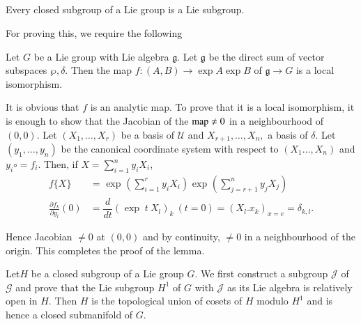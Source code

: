 \subsection{}\label{chap4-sec4.5} %

\begin{thm}[E. Cartan]\label{chap4-thm4}%
Every closed subgroup of a Lie group is a Lie subgroup.
\end{thm}

For proving this, we require the following

\setcounter{lem}{0}
\begin{lem}\label{chap4-lem1}%
 Let $G$ be a Lie group with Lie algebra $\mathfrak{g}$. Let
 $\mathfrak{g}$ be the direct sum of vector subspaces  $\wp,
 \delta$. Then the map $f: (A,B) \rightarrow \exp A \exp B$ of
 $\mathfrak{g}\rightarrow G$ is a local isomorphism. 
 \end{lem}


It is obvious that $f$ is an  analytic map. To prove that it is  a
local isomorphism, it is enough to show that the Jacobian of the
$\operatorname{map} \neq 0$ in a neighbourhood of $(0,0)$. Let $(X_{1}, \ldots, X_{r})$
be a basis of $\mathcal{U}$ and $X_{r+1},\ldots,X_{n},$ a basis of
$\delta$. 
 Let $(y_{1},\ldots,y_{n})$ be the canonical coordinate system with
 respect to $(X_{1}\ldots,X_{n})$ and $y_{i} \circ  = f_{i}$. Then,  if
 $ X = \sum\limits^{n}_{i=1}  y_i  X_i$, 
\begin{align*}
f\{X\} & = \text{ exp } ( \sum\limits^{r}_{i=1} y_i X_i ) \text{ exp }
( \sum\limits^{n}_{j=r+1} y_j X_j )\\ 
 \frac{\partial f_k}{\partial y_l}(0) & = \dfrac{d}{dt} (\text{ exp }~
 t ~X_l)_k~(t=0)=(X_l.x_k)_{x=e}=\delta_{k,l}.
\end{align*}

Hence Jacobian $\neq 0$ at $(0,0)$ and by continuity, $\neq 0$ in a
neighbourhood of the origin.   This completes the proof of the lemma. 

Let\pageoriginale $H$ be a closed subgroup of a Lie group $G$. We
first construct a 
subgroup $\mathscr{J}$ of $\mathscr{G}$ and prove that the Lie subgroup
$H^1$ of $G$  with $\mathscr{J}$ as its Lie algebra is
relatively open in $H$. Then $H$  is the topological union of cosets
of $H$ modulo $H^1$ and is hence a closed submanifold of $G$. 
  
